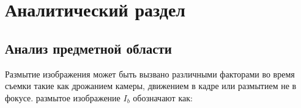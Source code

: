 \chapter{Аналитический раздел}


% 
% 

\section{Анализ предметной области}





Размытие изображения может быть вызвано различными факторами во время съемки такие как дрожанием камеры, движением в кадре или размытием не в фокусе. размытое изображение \(I_{b}\) обозначают как:

